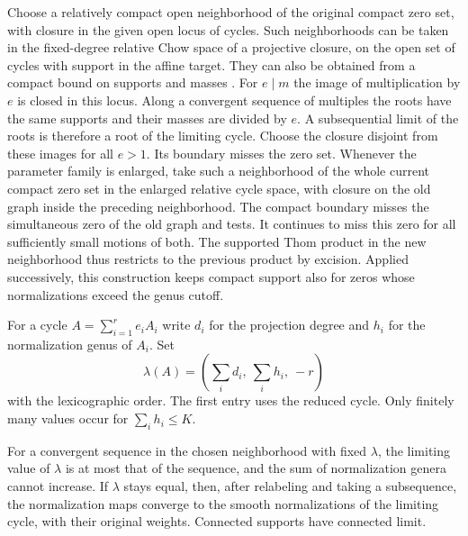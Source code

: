 Choose a relatively compact open neighborhood of the original compact
zero set, with closure in the given open locus of cycles. Such
neighborhoods can be taken in the fixed-degree relative Chow space
of a projective closure, on the open set of cycles with support in
the affine target. They can also be obtained from a compact bound
on supports and masses \cite[Theorem~2.11]{DIW}. For $e\mid m$ the
image of multiplication by $e$ is closed in this locus. Along a
convergent sequence of multiples the roots have the same supports
and their masses are divided by $e$. A subsequential limit of the
roots is therefore a root of the limiting cycle. Choose the closure
disjoint from these images for all $e>1$. Its boundary misses the
zero set. Whenever the parameter family is enlarged, take such a
neighborhood of the whole current compact zero set in the enlarged
relative cycle space, with closure on the old graph inside the
preceding neighborhood. The compact boundary misses the simultaneous
zero of the old graph and tests. It continues to miss this zero for
all sufficiently small motions of both. The supported Thom product
in the new neighborhood thus restricts to the previous product by
excision. Applied successively, this construction keeps compact
support also for zeros whose normalizations exceed the genus cutoff.

For a cycle $A=\sum_{i=1}^r e_iA_i$ write $d_i$ for the projection
degree and $h_i$ for the normalization genus of $A_i$. Set
\[
       \lambda(A)=\left(\sum_i d_i,\ \sum_i h_i,\ -r\right)
\]
with the lexicographic order. The first entry uses the reduced cycle.
Only finitely many values occur for $\sum_i h_i\le K$.

\begin{lemma}\label{lem:weighted-specialization}
For a convergent sequence in the chosen neighborhood with fixed
$\lambda$, the limiting value of $\lambda$ is at most that of the
sequence, and the sum of normalization genera cannot increase. If
$\lambda$ stays equal, then, after relabeling and taking a
subsequence, the normalization maps converge to the smooth
normalizations of the limiting cycle, with their original weights.
Connected supports have connected limit.
\end{lemma}

